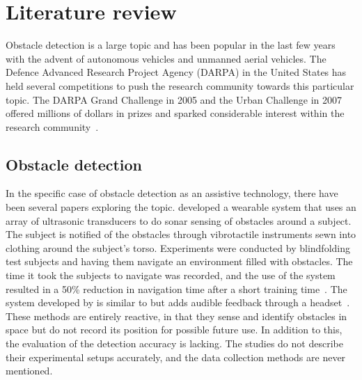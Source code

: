 \documentclass[prodmode,acmtosem]{acmsmall} %
\begin{document}
\section{Literature review} %
Obstacle detection is a large topic and has been popular in the last few years with the advent of autonomous vehicles and unmanned aerial vehicles.
The Defence Advanced Research Project Agency (DARPA) in the United States has held several competitions to push the research community towards this particular topic. The DARPA Grand Challenge in 2005 and the Urban Challenge in 2007 offered millions of dollars in prizes and sparked considerable interest within the research community~\cite{DARPAGrandChallenge2005,DARPAUrbanChallenge2007}.
\subsection{Obstacle detection}
In the specific case of obstacle detection as an assistive technology, there have been several papers exploring the topic. \citet{Cardin2007} developed a wearable system that uses an array of ultrasonic transducers to do sonar sensing of obstacles around a subject. The subject is notified of the obstacles through vibrotactile instruments sewn into clothing around the subject's torso. Experiments were conducted by blindfolding test subjects and having them navigate an environment filled with obstacles. The time it took the subjects to navigate was recorded, and the use of the system resulted in a 50\% reduction in navigation time after a short training time~\cite{Cardin2007}. The system developed by \citet{Shin2007} is similar to \citet{Cardin2007} but adds audible feedback through a headset~\cite{Shin2007}. These methods are entirely reactive, in that they sense and identify obstacles in space but do not record its position for possible future use. In addition to this, the evaluation of the detection accuracy is lacking. The studies do not describe their experimental setups accurately, and the data collection methods are never mentioned.
\end{document}
